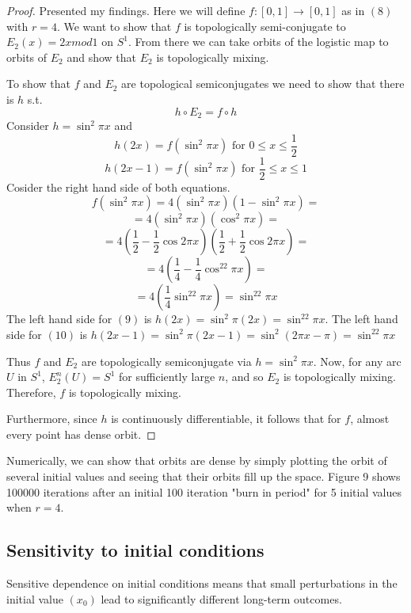 \documentclass[11pt,twocolumn]{article}
\begin{document}
\begin{proof}
	\item {Presented my findings.}
	Here we will define $f:[0,1]\to[0,1]$ as in $(8)$ with $r=4$.
	We want to show that $f$ is topologically semi-conjugate to $E_2(x)=2xmod 1$ on $S^1$. From there we can take orbits of the logistic map to orbits of $E_2$ and show that $E_2$ is topologically mixing.

	To show that $f$ and $E_2$ are topological semiconjugates we need to show that there is $h$ s.t.
	\[h\circ E_2=f\circ h\]
	Consider $h=\sin^2\pi x$ and
	\begin{equation}
	h(2x)=f(\sin^2\pi x)\text{ for }0\leq x\leq \frac{1}{2}
	\end{equation}
	\begin{equation}
	h(2x-1)=f(\sin^2\pi x)\text{ for }\frac{1}{2}\leq x\leq 1
	\end{equation}
	Cosider the right hand side of both equations.
	\[f(\sin^2\pi x)=4(\sin^2\pi x)(1-\sin^2\pi x)=\]
	\[=4(\sin^2\pi x)(\cos^2\pi x)=\]
	\[=4(\frac{1}{2}-\frac{1}{2}\cos2\pi x)(\frac{1}{2}+\frac{1}{2}\cos2\pi x)=\]
	\[=4(\frac{1}{4}-\frac{1}{4}\cos^22\pi x)=\]
	\[=4(\frac{1}{4}\sin^22\pi x)=\sin^22\pi x\]
	The left hand side for $(9)$ is $h(2x)=\sin^2\pi(2x)=\sin^22\pi x$.
	The left hand side for $(10)$ is $h(2x-1)=\sin^2\pi(2x-1)=\sin^2(2\pi x-\pi)=\sin^22\pi x$
	
	Thus $f$ and $E_2$ are topologically semiconjugate via $h=\sin^2\pi x$.
	Now, for any arc $U$ in $S^1$, $E_2^n(U)=S^1$ for sufficiently large $n$, and so $E_2$ is topologically mixing.
	Therefore, $f$ is topologically mixing.

	Furthermore, since $h$ is continuously differentiable, it follows that  for $f$, almost every point has dense orbit.



\end{proof}

Numerically, we can show that orbits are dense by simply plotting the orbit of several initial values and seeing that their orbits fill up the space.
Figure 9 shows 100000 iterations after an initial 100 iteration "burn in period" for 5 initial values when $r=4$.
\subsection{Sensitivity to initial conditions}
Sensitive dependence on initial conditions means that small perturbations in the initial value $(x_0)$ lead to significantly different long-term outcomes.
\end{document}
